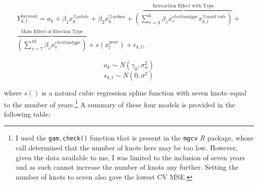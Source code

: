 \documentclass[12pt,twoside]{reedthesis}
\begin{document}
  \begin{multline}\tag{Model 4}
  Y^{turnout}_{k,l} = a_{k} + \beta_{1}x_k^{\% white} + \beta_{2}x_k^{\% urban} + \overbrace{(\sum_{v=3}^{6}\beta_{v}x_{v}^{election type} x_{k,l}^{\% mail~vote})}^\text{Interaction Effect with Type} + \\ \overbrace{(\sum_{v=7}^{10}\beta_{v}x_{v}^{election type})}^\text{Main Effect of Election Type} + s(x^{year}_{l}) + \epsilon_{k,l},
  \end{multline}
  
  \[a_{k} \sim N(\gamma_0, \sigma_{\alpha}^2)\]
  \[\epsilon_{k,l} \sim N(0, \sigma^2)\]
  
  where \(s()\) is a natural cubic regression spline function with seven
  knots--equal to the number of years.\footnote{I used the
    \texttt{gam.check()} function that is present in the \texttt{mgcv}
    \textit{R} package, whose call determined that the number of knots
    here may be too low. However, given the data available to me, I was
    limited to the inclusion of seven years and as such cannot increase
    the number of knots any further. Setting the number of knots to seven
    also gave the lowest CV MSE.} A summary of these four models is
  provided in the following table:
  
\end{document}
